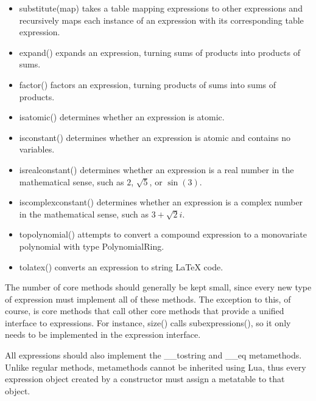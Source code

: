 \documentclass{article}
\begin{document}
\begin{itemize}
    \item {\ttfamily substitute(map)} takes a table mapping expressions to other expressions and recursively maps each instance of an expression with its corresponding table expression.
    
    \item {\ttfamily expand()} expands an expression, turning sums of products into products of sums.
    
    \item {\ttfamily factor()} factors an expression, turning products of sums into sums of products.
    
    \item {\ttfamily isatomic()} determines whether an expression is atomic.
    
    \item {\ttfamily isconstant()} determines whether an expression is atomic and contains no variables.
    
    \item {\ttfamily isrealconstant()} determines whether an expression is a real number in the mathematical sense, such as $2$, $\sqrt{5}$, or $\sin(3)$.
    
    \item {\ttfamily iscomplexconstant()} determines whether an expression is a complex number in the mathematical sense, such as $3 + \sqrt{2}i$.
    
    \item {\ttfamily topolynomial()} attempts to convert a compound expression to a monovariate polynomial with type {\ttfamily PolynomialRing}.
    
    \item {\ttfamily tolatex()} converts an expression to string \LaTeX{} code.
\end{itemize}

The number of core methods should generally be kept small, since every new type of expression must implement all of these methods. The exception to this, of course, is core methods that call other core methods that provide a unified interface to expressions. For instance, {\ttfamily size()} calls {\ttfamily subexpressions()}, so it only needs to be implemented in the expression interface.

All expressions should also implement the {\ttfamily \_\_tostring} and {\ttfamily \_\_eq} metamethods. Unlike regular methods, metamethods cannot be inherited using Lua, thus every expression object created by a constructor must assign a metatable to that object.
\end{document}
